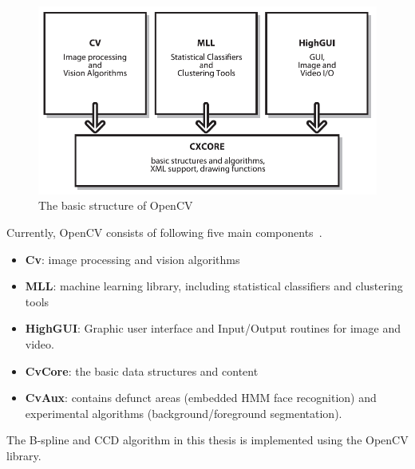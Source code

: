 \begin{figure}[htbp]
  \centering
\includegraphics[width=\linewidth]{images/bsopencv.png}
  \caption{The basic structure of OpenCV~\cite{bradski2008learning}}
  \label{fig:bsopencv}
\end{figure}

Currently, OpenCV consists of following five main components~\cite{bradski2008learning}.
\begin{itemize}
\item \textbf{Cv}: image processing and vision algorithms
\item \textbf{MLL}: machine learning library, including statistical classifiers and clustering tools
\item \textbf{HighGUI}: Graphic user interface and Input/Output
  routines for image and video.
\item \textbf{CvCore}: the basic data structures and content
\item \textbf{CvAux}: contains defunct areas (embedded HMM face
  recognition) and experimental algorithms (background/foreground
  segmentation).
\end{itemize}

The B-spline and CCD algorithm in this thesis is implemented using the
OpenCV library.


